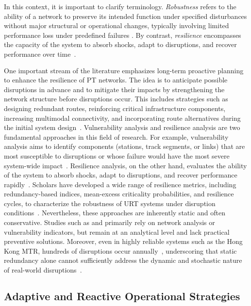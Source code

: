 \documentclass[3p,times,procedia]{elsarticle}
\begin{document}
In this context, it is important to clarify terminology. \emph{Robustness} refers to the ability of a network to preserve its intended function under specified disturbances without major structural or operational changes, typically involving limited performance loss under predefined failures \citep{Cats2016,Ge2022,JRC2015}.
By contrast, \emph{resilience} encompasses the capacity of the system to absorb shocks, adapt to disruptions, and recover performance over time~\citep{NRC2012,TierneyBruneau2007,Bruneau2003}.

One important stream of the literature emphasizes long-term proactive planning to enhance the resilience of PT networks. 
The idea is to anticipate possible disruptions in advance and to mitigate their impacts by strengthening the network structure 
before disruptions occur. 
This includes strategies such as designing redundant routes, reinforcing critical infrastructure components, 
increasing multimodal connectivity, and incorporating route alternatives during the initial system design~\citep{Codina2014,LiWang2019,CatsJenelius2014,Jin2014}. 
Vulnerability analysis and resilience analysis are two fundamental approaches in this field of research. 
% 
For example, vulnerability analysis aims to identify components (stations, track segments, or links) that are most susceptible to disruptions 
or whose failure would have the most severe system-wide impact~\citep{DeLosSantos2012,RodriguezNunez2014}. 
Resilience analysis, on the other hand, evaluates the ability of the system to absorb shocks, adapt to disruptions, and recover performance 
rapidly~\citep{XuChopra2022,ChenMillerHooks2012}. 
Scholars have developed a wide range of resilience metrics, including redundancy-based indices, 
mean-excess criticality probabilities, and resilience cycles, to characterize the robustness of URT systems under disruption conditions~\citep{Zhang2015topology, XuChopra2022}.
Nevertheless, these approaches are inherently static and often conservative. 
Studies such as \citet{LiWang2019} and \citet{CatsJenelius2014} primarily rely on network analysis or vulnerability indicators, 
but remain at an analytical level and lack practical preventive solutions. 
Moreover, even in highly reliable systems such as the Hong Kong MTR, hundreds of disruptions occur annually~\citep{zhang2020metro}, underscoring that static redundancy alone cannot sufficiently address the dynamic and stochastic nature of real-world disruptions~\citep{Besinovic2020,Lusby2018}.

\subsection{Adaptive and Reactive Operational Strategies}\label{subsec:adaptive}
\end{document}
